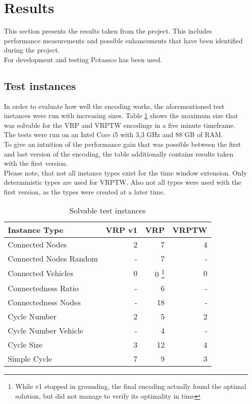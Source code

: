 \documentclass[12pt, letterpaper]{article}
\begin{document}
\section{Results}
This section presents the results taken from the project. This includes performance measurements and possible enhancements that have been identified during the project.\\
For development and testing Potassco \cite{potassco} has been used.

\subsection{Test instances}
In order to evaluate how well the encoding works, the aforementioned test instances were run with increasing sizes. Table \ref{table:benchmark} shows the maximum size that was solvable for the VRP and VRPTW encodings in a five minute timeframe. The tests were run on an Intel Core i5 with 3,3 GHz and 88 GB of RAM.\\
To give an intuition of the performance gain that was possible between the first and last version of the encoding, the table additionally contains results taken with the first version.\\
Please note, that not all instance types exist for the time window extension. Only deterministic types are used for VRPTW. Also not all types were used with the first version, as the types were created at a later time.

\begin{table}
\begin{tabular}{l | r | r | r}
Instance Type			& VRP v1	& VRP	& VRPTW\\
\hline
Connected Nodes			& 2			& 7		& 4\\
Connected Nodes Random	& -			& 7		& -\\
Connected Vehicles		& 0			& 0 \footnote{While v1 stopped in grounding, the final encoding actually found the optimal solution, but did not manage to verify its optimality in time}	& 0\\
Connectedness Ratio		& -			& 6		& -\\
Connectedness Nodes		& -			& 18	& -\\
Cycle Number			& 2			& 5		& 2\\
Cycle Number Vehicle	& -			& 4		& -\\
Cycle Size				& 3 		& 12	& 4\\
Simple Cycle			& 7			& 9		& 3\\
\end{tabular}
\caption{Solvable test instances}
\label{table:benchmark}
\end{table}
\end{document}
